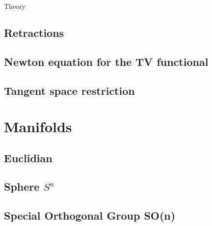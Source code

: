\begin{chapter}{Theory}
\subsection{Retractions} %
\label{sub:Retractions}


\subsection{Newton equation for the TV functional} %
\label{sub:Newton equation for the TV functional}

\subsection{Tangent space restriction} %
\label{sub:Tangent space restriction}



\section{Manifolds} %
\label{sec:Manifolds}

\subsection{Euclidian} %
\label{sub:Euclidian}


\subsection{Sphere $S^n$} %
\label{sub:Sphere}


\subsection{Special Orthogonal Group SO(n)} %
\label{sub:SO(N)}


\end{chapter}
